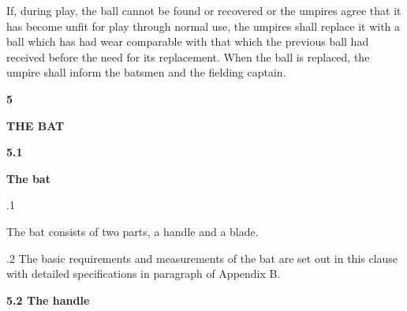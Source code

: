\documentclass[12pt]{article}
\begin{document}
\vspace{\baselineskip}
\begin{adjustwidth}{0.0in}{0.04in}
{\fontsize{9pt}{10.8pt}\selectfont If, during play, the ball cannot be found or recovered or the umpires agree that it has become unfit for play through normal use, the umpires shall replace it with a ball which has had wear comparable with that which the previous ball had received before the need for its replacement. When the ball is replaced, the umpire shall inform the batsmen and the fielding captain.\par}\par

\end{adjustwidth}


\vspace{\baselineskip}
{\fontsize{16pt}{19.2pt}\selectfont \textbf{5 \tabto{0.29in} }{\fontsize{15pt}{18.0pt}\selectfont \textbf{THE BAT}\par}\par}\par


\vspace{\baselineskip}
{\fontsize{11pt}{13.2pt}\selectfont \textbf{5.1 \tabto{0.47in} }{\fontsize{10pt}{12.0pt}\selectfont \textbf{The bat}\par}\par}\par


\vspace{\baselineskip}
{\fontsize{9pt}{10.8pt}.1 \tabto{0.49in} {\fontsize{8pt}{9.6pt}\selectfont The bat consists of two parts, a handle and a blade.\par}\par}\par


\vspace{\baselineskip}
\begin{adjustwidth}{0.5in}{0.0in}
{\fontsize{9pt}{10.8pt}.2 \tabto{0.49in} The basic requirements and measurements of the bat are set out in this clause with detailed specifications in paragraph of Appendix B.\par}\par

\end{adjustwidth}


\vspace{\baselineskip}
{\fontsize{11pt}{13.2pt}\selectfont \textbf{5.2 \tabto{0.47in} The handle}\par}\par
\end{document}
